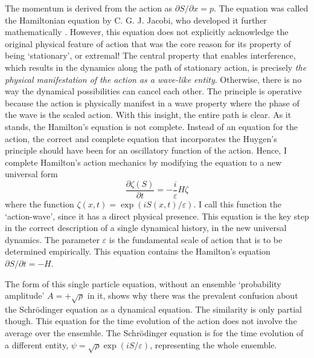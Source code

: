 The momentum is derived from the action as $\partial S/ \partial x = p$. The equation was called the
Hamiltonian equation by C. G. J. Jacobi, who developed it further mathematically \cite{chap14-key7}.
However, this equation does not explicitly acknowledge the original physical feature of action
that was the core reason for its property of being `stationary', or extremal! The central
property that enables interference, which results in the dynamics along the path of stationary
action, is precisely \textit{the physical manifestation of the action as a wave-like entity}. Otherwise, there
is no way the dynamical possibilities can cancel each other. The principle is operative because
the action is physically manifest in a wave property where the phase of the wave is the scaled
action. With this insight, the entire path is clear. As it stands, the Hamilton's equation
is not complete. Instead of an equation for the action, the correct and complete equation
that incorporates the Huygen's principle should have been for an oscillatory function of the
action. Hence, I complete Hamilton's action mechanics by modifying the equation to a new
universal form \cite{chap14-key2}
\begin{equation*}
\frac{\partial \zeta(S)}{\partial t} = - \frac{i}{\varepsilon} H \zeta \tag{23}\label{c14-eq23}
\end{equation*}
where the function $\zeta(x, t) = \exp(iS(x, t)/\varepsilon)$. I call this function the `action-wave', since it
has a direct physical presence. This equation is the key step in the correct description of a
single dynamical history, in the new universal dynamics. The
parameter $\varepsilon$ is the fundamental scale of action that is to be determined empirically. This
equation contains the Hamilton's equation $\partial S/\partial t = -H$.

The form of this single particle equation, without an ensemble `probability amplitude'
$A = + \sqrt{\rho}$ in it, shows why there was the prevalent confusion about the Schr\"{o}dinger equation
as a dynamical equation. The similarity is only partial though. This equation for the
time evolution of the action does not involve the average over the ensemble. The Schr\"{o}dinger
equation is for the time evolution of a different entity, $\psi = \sqrt{\rho} \exp(iS/\varepsilon)$, representing the
whole ensemble.

